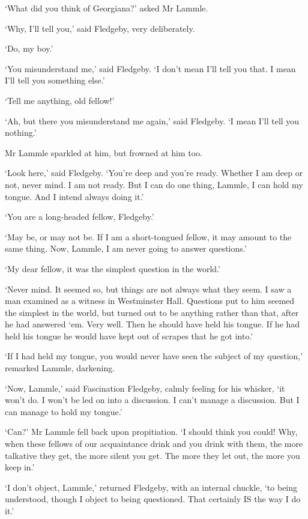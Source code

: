 ‘What did you think of Georgiana?’ asked Mr Lammle.

‘Why, I’ll tell you,’ said Fledgeby, very deliberately.

‘Do, my boy.’

‘You misunderstand me,’ said Fledgeby. ‘I don’t mean I’ll tell you that.
I mean I’ll tell you something else.’

‘Tell me anything, old fellow!’

‘Ah, but there you misunderstand me again,’ said Fledgeby. ‘I mean I’ll
tell you nothing.’

Mr Lammle sparkled at him, but frowned at him too.

‘Look here,’ said Fledgeby. ‘You’re deep and you’re ready. Whether I am
deep or not, never mind. I am not ready. But I can do one thing, Lammle,
I can hold my tongue. And I intend always doing it.’

‘You are a long-headed fellow, Fledgeby.’

‘May be, or may not be. If I am a short-tongued fellow, it may amount to
the same thing. Now, Lammle, I am never going to answer questions.’

‘My dear fellow, it was the simplest question in the world.’

‘Never mind. It seemed so, but things are not always what they seem. I
saw a man examined as a witness in Westminster Hall. Questions put to
him seemed the simplest in the world, but turned out to be anything
rather than that, after he had answered ‘em. Very well. Then he should
have held his tongue. If he had held his tongue he would have kept out
of scrapes that he got into.’

‘If I had held my tongue, you would never have seen the subject of my
question,’ remarked Lammle, darkening.

‘Now, Lammle,’ said Fascination Fledgeby, calmly feeling for his
whisker, ‘it won’t do. I won’t be led on into a discussion. I can’t
manage a discussion. But I can manage to hold my tongue.’

‘Can?’ Mr Lammle fell back upon propitiation. ‘I should think you could!
Why, when these fellows of our acquaintance drink and you drink with
them, the more talkative they get, the more silent you get. The more
they let out, the more you keep in.’

‘I don’t object, Lammle,’ returned Fledgeby, with an internal chuckle,
‘to being understood, though I object to being questioned. That
certainly IS the way I do it.’

